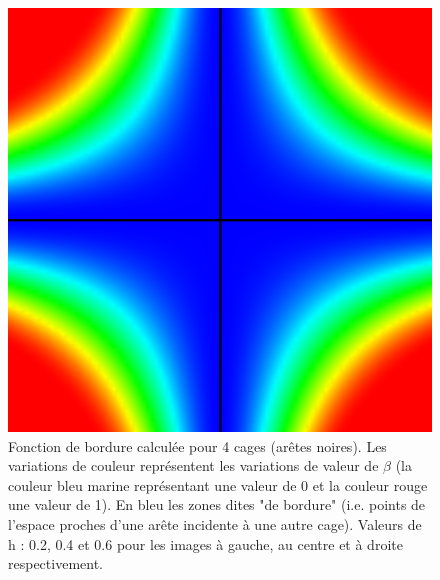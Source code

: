 \begin{figure}[h]
\begin{center}
    \includegraphics[scale=0.35]{starCage-0-6}
    \caption{Fonction de bordure calculée pour 4 cages (arêtes
      noires). Les variations de couleur représentent les variations
      de valeur de $\beta$ (la couleur bleu marine représentant une
      valeur de 0 et la couleur rouge une valeur de 1). En bleu les
      zones dites "de bordure" (i.e. points de l'espace proches d'une
      arête incidente à une autre cage). Valeurs de h : 0.2, 0.4 et
      0.6 pour les images à gauche, au centre et à droite
      respectivement.}
    \label{MELpar}
  \end{center}
\end{figure}

